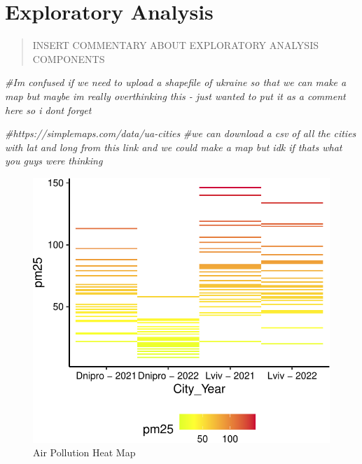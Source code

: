 \documentclass[
  12pt,
]{article}
\newenvironment{Shaded}{\begin{snugshade}}{\end{snugshade}}
\newcommand{\CommentTok}[1]{\textcolor[rgb]{0.56,0.35,0.01}{\textit{#1}}}
\begin{document}
\newpage

\hypertarget{exploratory-analysis}{%
\section{Exploratory Analysis}\label{exploratory-analysis}}

\begin{quote}
INSERT COMMENTARY ABOUT EXPLORATORY ANALYSIS COMPONENTS
\end{quote}

\begin{Shaded}
\begin{Highlighting}[]
\CommentTok{\#I\textquotesingle{}m confused if we need to upload a shapefile of ukraine so that we can make a map but maybe im really overthinking this {-} just wanted to put it as a comment here so i dont forget }

\CommentTok{\#https://simplemaps.com/data/ua{-}cities}
\CommentTok{\#we can download a csv of all the cities with lat and long from this link and we could make a map but idk if thats what you guys were thinking}
\end{Highlighting}
\end{Shaded}

\begin{figure}
\centering
\includegraphics{Fontanie_Gordon_Weinberg_Project_files/figure-latex/heat map of air pollution-1.pdf}
\caption{Air Pollution Heat Map}
\end{figure}
\end{document}
